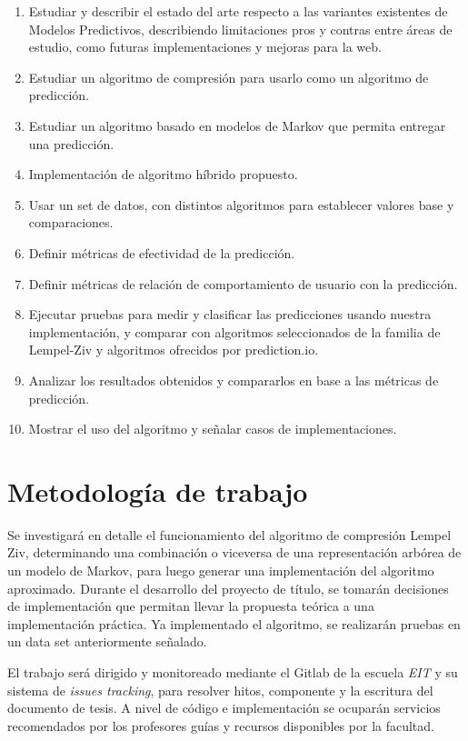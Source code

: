 \documentclass{udparticle}
\begin{document}
\begin{enumerate}
  \item Estudiar y describir el estado del arte respecto a las variantes existentes de Modelos Predictivos, describiendo limitaciones pros y contras entre áreas de estudio, como futuras implementaciones y mejoras para la web.
  \item Estudiar un algoritmo de compresión para usarlo como un algoritmo de predicción.
  \item Estudiar un algoritmo basado en modelos de Markov que permita entregar una predicción.
  \item Implementación de algoritmo híbrido propuesto.
  \item Usar un set de datos, con distintos algoritmos para establecer valores base y comparaciones.
  \item Definir métricas de efectividad de la predicción.
  \item Definir métricas de relación de comportamiento de usuario con la predicción. 
  \item Ejecutar pruebas para medir y clasificar las predicciones usando nuestra implementación, y comparar con algoritmos seleccionados de la familia de Lempel-Ziv y algoritmos ofrecidos por prediction.io. %
  
  \item Analizar los resultados obtenidos y compararlos en base a las métricas de predicción.
  \item Mostrar el uso del algoritmo y señalar casos de  implementaciones.
\end{enumerate}


\section{Metodología de trabajo}

Se investigará en detalle el funcionamiento del algoritmo de compresión Lempel Ziv, determinando una combinación o viceversa de una representación arbórea de un modelo de Markov, para luego generar una implementación del algoritmo aproximado.
Durante el desarrollo del proyecto de título, se tomarán decisiones de implementación que permitan llevar la propuesta teórica a una implementación práctica. Ya implementado el algoritmo, se realizarán pruebas en un data set anteriormente señalado.

El trabajo será dirigido y monitoreado mediante el Gitlab de la escuela \emph{EIT} y su sistema de \emph{issues tracking}, para resolver hitos, componente y la escritura del documento de tesis. A nivel de código e implementación se ocuparán servicios recomendados por los profesores guías y recursos disponibles por la facultad.
\end{document}

